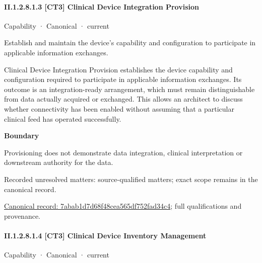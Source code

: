 \paragraph*{II.1.2.8.1.3 [CT3] Clinical Device Integration Provision}
\label{navigation:II.1.2.8.1.3}

\label{element:7abab1d7d68f48cea565df752fad34c4}
{\small Capability · Canonical · current}\par

Establish and maintain the device’s capability and configuration to participate in applicable information exchanges.



Clinical Device Integration Provision establishes the device capability and configuration required to participate in applicable information exchanges. Its outcome is an integration-ready arrangement, which must remain distinguishable from data actually acquired or exchanged. This allows an architect to discuss whether connectivity has been enabled without assuming that a particular clinical feed has operated successfully.



\textbf{Boundary}



Provisioning does not demonstrate data integration, clinical interpretation or downstream authority for the data.


{\small Recorded unresolved matters: source-qualified matters; exact scope remains in the canonical record.}\par
{\footnotesize \href{../../../../../../../continuum/strategy/capability/7abab1d7d68f48cea565df752fad34c4.md}{Canonical record: 7abab1d7d68f48cea565df752fad34c4}; full qualifications and provenance.}\par
\paragraph*{II.1.2.8.1.4 [CT3] Clinical Device Inventory Management}
\label{navigation:II.1.2.8.1.4}

\label{element:f8205d4cf8144f34b2da1139ff45c868}
{\small Capability · Canonical · current}\par

